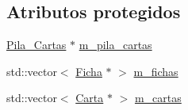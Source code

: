 \subsection*{Atributos protegidos}
\begin{DoxyCompactItemize}
\item 
\hyperlink{class_pila___cartas}{Pila\-\_\-\-Cartas} $\ast$ \hyperlink{class_casilla_a7a504fb15f0f824ff29026fa906e6ac2}{m\-\_\-pila\-\_\-cartas}
\item 
std\-::vector$<$ \hyperlink{class_ficha}{Ficha} $\ast$ $>$ \hyperlink{class_casilla_ac1a0f2ae8b3401713d8d0d8406e5e91e}{m\-\_\-fichas}
\item 
std\-::vector$<$ \hyperlink{class_carta}{Carta} $\ast$ $>$ \hyperlink{class_casilla_ae170cb05b44865b64398252faa79c9d4}{m\-\_\-cartas}
\end{DoxyCompactItemize}


